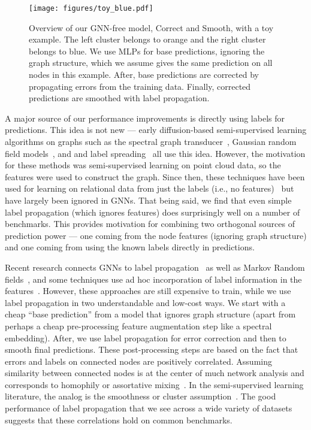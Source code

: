 \documentclass{article}
\begin{document}
\begin{figure}[t]
    \centering
    \texttt{[image: figures/toy\_blue.pdf]}
    \caption{Overview of our GNN-free model, Correct and Smooth, with a toy example. The left cluster belongs to orange and the right cluster belongs to blue. We use MLPs for base predictions, ignoring the graph structure,
    which we assume gives the same prediction on all nodes in this example. After, base predictions are corrected by propagating errors from the training data. Finally, corrected
    predictions are smoothed with label propagation.}
    \label{fig:overview}
\end{figure}

A major source of our performance improvements is directly using labels for predictions.
This idea is not new --- early diffusion-based semi-supervised learning algorithms on graphs such as
the spectral graph transducer~\citep{joachims2003transductive},
Gaussian random field models~\citep{Zhu2003SemiSupervisedLU}, and
and label spreading~\citep{zhou2004learning}
all use this idea.
However, the motivation for these methods was semi-supervised learning on point cloud data,
so the features were used to construct the graph.
Since then, these techniques have been used for learning on relational data from just the labels (i.e., no features)~\citep{koutra2011unifying,gleich2015using,peel2017graph,chin2019decoupled}
but have largely been ignored in GNNs. 
That being said, we find that even simple label propagation (which ignores features) does surprisingly well on a number of benchmarks.
This provides motivation for combining two orthogonal sources of prediction power --- one coming from the node features (ignoring graph structure)
and one coming from using the known labels directly in predictions.

Recent research connects GNNs to
label propagation~\citep{wang2020unifying,Jia-2020-GNNR} as well as
Markov Random fields~\citep{qu2019gmnn,gao2019conditional}, and
some techniques use ad hoc incorporation of label information in the features~\citep{shi2020masked}.
However, these approaches are still expensive to train,
while we use label propagation in two understandable and low-cost ways.
We start with a cheap ``base prediction'' from a model that ignores graph structure 
(apart from perhaps a cheap pre-processing feature augmentation step like a spectral embedding).
After, we use label propagation for error correction and then to smooth final predictions.
These post-processing steps are based on the fact that errors and labels on connected nodes are positively correlated.
Assuming similarity between connected nodes is at the center of much network analysis
and corresponds to homophily or assortative mixing~\citep{mcpherson2001birds,newman2003mixing,easley2010networks}.
In the semi-supervised learning literature, the analog is the 
smoothness or cluster assumption~\citep{chapelle2003cluster,zhu2005semi}. 
The good performance of label propagation that we see across a wide variety of datasets 
suggests that these correlations hold on common benchmarks.
\end{document}
